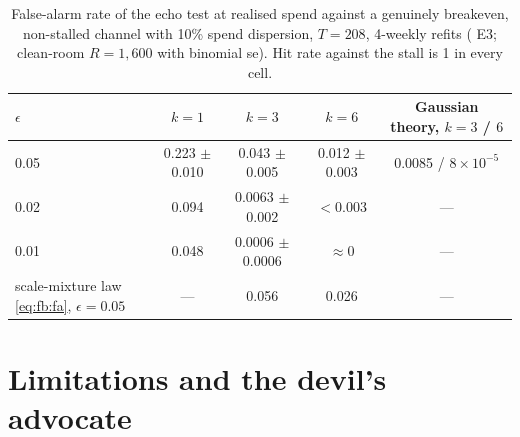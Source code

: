 \begin{table}[htbp]
\centering\footnotesize
\caption{False-alarm rate of the echo test at realised spend against a genuinely breakeven, non-stalled channel with 10\% spend dispersion, $T = 208$, 4-weekly refits ( E3; clean-room $R = 1{,}600$ with binomial se). Hit rate against the stall is 1 in every cell.}
\label{fb:tab:fa}
\begin{tabular}{lcccc}
\toprule
$\epsilon$ & $k = 1$ & $k = 3$ & $k = 6$ & Gaussian theory, $k = 3$ / $6$ \\
\midrule
0.05 & 0.223 $\pm$ 0.010 & 0.043 $\pm$ 0.005 & 0.012 $\pm$ 0.003 & 0.0085 / $8\times10^{-5}$ \\
0.02 & 0.094 & 0.0063 $\pm$ 0.002 & $< 0.003$ & --- \\
0.01 & 0.048 & 0.0006 $\pm$ 0.0006 & $\approx 0$ & --- \\
\midrule
scale-mixture law \cref{eq:fb:fa}, $\epsilon = 0.05$ & --- & 0.056 & 0.026 & --- \\
\bottomrule
\end{tabular}
\end{table}

\section{Limitations and the devil's advocate}


